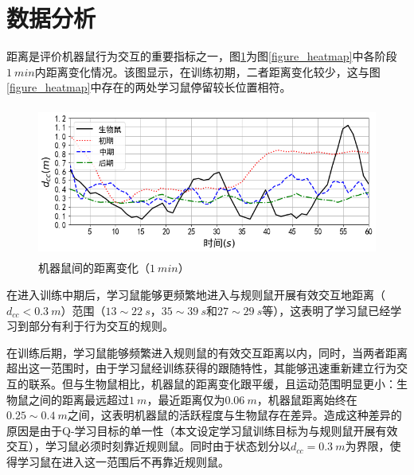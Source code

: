 \section{数据分析}
距离是评价机器鼠行为交互的重要指标之一，图\ref{figure_distance}为图\ref{figure_heatmap}中各阶段$1~min$内距离变化情况。该图显示，在训练初期，二者距离变化较少，这与图\ref{figure_heatmap}中存在的两处学习鼠停留较长位置相符。
\begin{figure}[htb]
  \centering
  \includegraphics[height=5cm]{images/ch05/distance.png}
  \caption{机器鼠间的距离变化（$1~min$）}\label{figure_distance}
\end{figure}

在进入训练中期后，学习鼠能够更频繁地进入与规则鼠开展有效交互地距离（$d_{cc}<0.3~m$）范围（$13\sim22~s$，$35\sim39~s$和$27\sim29~s$等），这表明了学习鼠已经学习到部分有利于行为交互的规则。

在训练后期，学习鼠能够频繁进入规则鼠的有效交互距离以内，同时，当两者距离超出这一范围时，由于学习鼠经训练获得的跟随特性，其能够迅速重新建立行为交互的联系。但与生物鼠相比，机器鼠的距离变化跟平缓，且运动范围明显更小：生物鼠之间的距离最远超过$1~m$，最近距离仅为$0.06~m$，机器鼠距离始终在$0.25\sim 0.4~m$之间，这表明机器鼠的活跃程度与生物鼠存在差异。造成这种差异的原因是由于Q-学习目标的单一性（本文设定学习鼠训练目标为与规则鼠开展有效交互），学习鼠必须时刻靠近规则鼠。同时由于状态划分以$d_{cc}=0.3~m$为界限，使得学习鼠在进入这一范围后不再靠近规则鼠。

